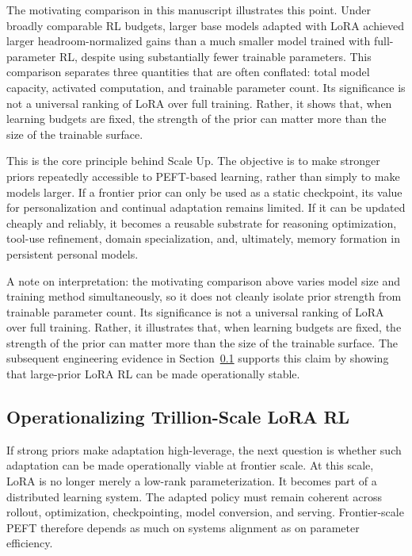 The motivating comparison in this manuscript illustrates this point. Under broadly comparable RL budgets, larger base models adapted with LoRA achieved larger headroom-normalized gains than a much smaller model trained with full-parameter RL, despite using substantially fewer trainable parameters. This comparison separates three quantities that are often conflated: total model capacity, activated computation, and trainable parameter count. Its significance is not a universal ranking of LoRA over full training. Rather, it shows that, when learning budgets are fixed, the strength of the prior can matter more than the size of the trainable surface.



This is the core principle behind Scale Up. The objective is to make stronger priors repeatedly accessible to PEFT-based learning, rather than simply to make models larger. If a frontier prior can only be used as a static checkpoint, its value for personalization and continual adaptation remains limited. If it can be updated cheaply and reliably, it becomes a reusable substrate for reasoning optimization, tool-use refinement, domain specialization, and, ultimately, memory formation in persistent personal models.

A note on interpretation: the motivating comparison above varies model size and training method simultaneously, so it does not cleanly isolate prior strength from trainable parameter count. Its significance is not a universal ranking of LoRA over full training. Rather, it illustrates that, when learning budgets are fixed, the strength of the prior can matter more than the size of the trainable surface. The subsequent engineering evidence in Section~\ref{subsec:trillion-practical} supports this claim by showing that large-prior LoRA RL can be made operationally stable.

\subsection{Operationalizing Trillion-Scale LoRA RL}\label{subsec:trillion-practical}

If strong priors make adaptation high-leverage, the next question is whether such adaptation can be made operationally viable at frontier scale. At this scale, LoRA is no longer merely a low-rank parameterization. It becomes part of a distributed learning system. The adapted policy must remain coherent across rollout, optimization, checkpointing, model conversion, and serving. Frontier-scale PEFT therefore depends as much on systems alignment as on parameter efficiency.

